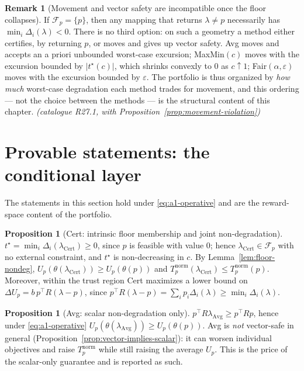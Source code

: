 \documentclass[12pt,a4paper]{report}
\newcommand{\1}{\mathbf{1}}
\newcommand{\Floor}{\mathcal{F}_{p}}
\theoremstyle{definition}
\newtheorem{remark}[definition]{Remark}
\newtheorem{proposition}[definition]{Proposition}
\begin{document}
\begin{remark}[Movement and vector safety are incompatible once the floor collapses]
\label{rem:organising}
If \(\Floor=\{p\}\), then any mapping that returns \(\lambda\ne p\) necessarily has \(\min_i\Delta_i(\lambda)<0\). There is no third option: on such a geometry a method either certifies, by returning \(p\), or moves and gives up vector safety. Avg moves and accepts an a priori unbounded worst-case excursion; MaxMin\((c)\) moves with the excursion bounded by \(\lvert t^\star(c)\rvert\), which shrinks convexly to \(0\) as \(c\uparrow1\); Fair\((\alpha,\varepsilon)\) moves with the excursion bounded by \(\varepsilon\). The portfolio is thus organized by \emph{how much} worst-case degradation each method trades for movement, and this ordering --- not the choice between the methods --- is the structural content of this chapter. \emph{(catalogue R27.1, with Proposition~\ref{prop:movement-violation})}
\end{remark}

\section{Provable statements: the conditional layer}
\label{sec:conditional}

The statements in this section hold under \eqref{eq:a1-operative} and are the reward-space content of the portfolio.

\begin{proposition}[Cert: intrinsic floor membership and joint non-degradation]
\label{prop:cert}
\(t^\star=\min_i\Delta_i(\lambda_{\mathrm{Cert}})\ge0\), since \(p\) is feasible with value \(0\); hence \(\lambda_{\mathrm{Cert}}\in\Floor\) with no external constraint, and \(t^\star\) is non-decreasing in \(c\). By Lemma~\ref{lem:floor-nondeg}, \(U_p(\theta(\lambda_{\mathrm{Cert}}))\ge U_p(\theta(p))\) and \(T_p^{\mathrm{norm}}(\lambda_{\mathrm{Cert}})\le T_p^{\mathrm{norm}}(p)\). Moreover, within the trust region Cert maximizes a lower bound on \(\Delta U_p=b\,p^\top R(\lambda-p)\), since \(p^\top R(\lambda-p)=\sum_i p_i\Delta_i(\lambda)\ge\min_i\Delta_i(\lambda)\).
\end{proposition}

\begin{proposition}[Avg: scalar non-degradation only]
\label{prop:avg}
\(p^\top R\lambda_{\mathrm{Avg}}\ge p^\top Rp\), hence under \eqref{eq:a1-operative} \(U_p(\theta(\lambda_{\mathrm{Avg}}))\ge U_p(\theta(p))\). Avg is \emph{not} vector-safe in general (Proposition~\ref{prop:vector-implies-scalar}): it can worsen individual objectives and raise \(T_p^{\mathrm{norm}}\) while still raising the average \(U_p\). This is the price of the scalar-only guarantee and is reported as such.
\end{proposition}
\end{document}
